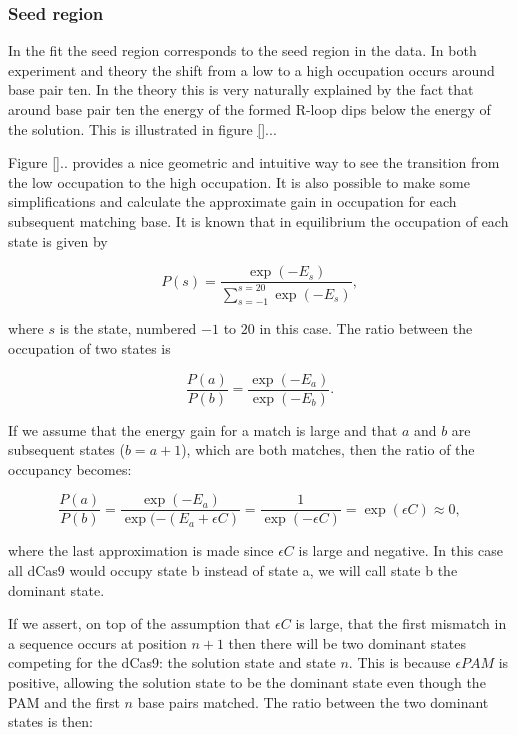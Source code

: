 \subsubsection{Seed region}
\label{sec:minmodelresultsseedregion}

In the fit the seed region corresponds to the seed region in the data. In both experiment and theory the shift from a low to a high occupation occurs around base pair ten. In the theory this is very naturally explained by the fact that around base pair ten the energy of the formed R-loop dips below the energy of the solution. This is illustrated in figure \ref{}... %


Figure \ref{}.. %
provides a nice geometric and intuitive way to see the transition from the low occupation to the high occupation. It is also possible to make some simplifications and calculate the approximate gain in occupation for each subsequent matching base. It is known that in equilibrium the occupation of each state is given by

\begin{equation}
P(s) = \frac{\exp(-E_s)}{\sum_{s=-1}^{s=20}\exp(-E_s)},
\end{equation}

where $s$ is the state, numbered $-1$ to $20$ in this case. The ratio between the occupation of two states is

\begin{equation}
\frac{P(a)}{P(b)} = \frac{\exp(-E_a)}{\exp(-E_b)}.
\end{equation}

If we assume that the energy gain for a match is large and that $a$ and $b$ are subsequent states ($b = a+1$), which are both matches, then the ratio of the occupancy becomes:

\begin{equation}
\frac{P(a)}{P(b)} = \frac{\exp(-E_a)}{\exp(-(E_a + \epsilon C)} = \frac{1}{\exp(-\epsilon C)} = \exp(\epsilon C) \approx 0,
\end{equation}

where the last approximation is made since $\epsilon C$ is large and negative. In this case all dCas9 would occupy state b instead of state a, we will call state b the dominant state.

If we assert, on top of the assumption that $\epsilon C$ is large, that the first mismatch in a sequence occurs at position $n+1$ then there will be two dominant states competing for the dCas9: the solution state and state $n$. This is because $\epsilon PAM$ is positive, allowing the solution state to be the dominant state even though the PAM and the first $n$ base pairs matched. The ratio between the two dominant states is then:

